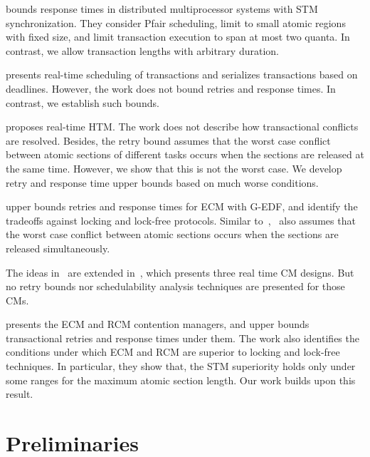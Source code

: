 \documentclass[conference]{IEEEtran}
\begin{document}
\cite{fahmy2009bounding} bounds response times in distributed multiprocessor systems with STM synchronization. They consider Pfair scheduling, limit to small atomic regions with fixed size, and limit transaction execution to span at most two quanta. In contrast, we allow transaction lengths 
with  arbitrary duration. 

\cite{sarni2009real} presents real-time scheduling of transactions and serializes transactions based on deadlines. However, the work does not bound retries and response times. In contrast, we establish such bounds.


\cite{schoeberl2010rttm} proposes real-time HTM. The work does not describe how transactional conflicts are resolved. Besides, the retry bound assumes that the worst case conflict between atomic sections of different tasks occurs when the sections are released at the same time. However, we show that this is not the worst case. We develop retry and response time upper bounds based on much worse conditions.


\cite{key-1} upper bounds retries and response times for  ECM with G-EDF, and identify the tradeoffs against locking and lock-free protocols. Similar to~\cite{schoeberl2010rttm},~\cite{key-1} also assumes that the worst case conflict between atomic sections occurs when the sections are released simultaneously. 

The ideas in~\cite{key-1} are extended in~\cite{barrosmanaging}, which presents three real time CM designs. But no retry bounds nor schedulability analysis techniques are presented for those CMs. 

\cite{stmconcurrencycontrol:emsoft11} presents the ECM and RCM contention managers, and upper bounds transactional retries and response times under them. The work also identifies the conditions under which ECM and RCM are superior to locking and lock-free techniques. In particular, they show that, the STM superiority holds only under some ranges for the maximum atomic section length. Our work builds upon this result.

\section{Preliminaries}
\label{sec:model}
\end{document}
